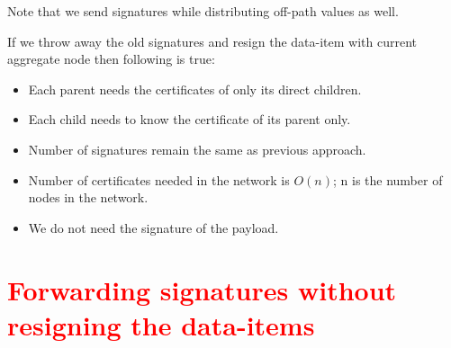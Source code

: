 		Note that we send signatures while distributing off-path values as well.
	
		If we throw away the old signatures and resign the data-item with current aggregate node then following is true:
			\begin{itemize}
				\item Each parent needs the certificates of only its direct children.
				\item Each child needs to know the certificate of its parent only.
				\item Number of signatures remain the same as previous approach.
				\item Number of certificates needed in the network is $O(n)$; n is the number of nodes in the network.
				\item We do not need the signature of the payload.
			\end{itemize}

	\section{\textcolor{red}{Forwarding signatures without resigning the data-items}}
